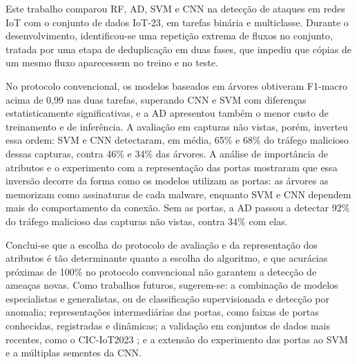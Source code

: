 \documentclass[alpha-refs,brazilian]{CC-EC_TF-TC}
\begin{document}
Este trabalho comparou RF, AD, SVM e CNN na detecção de ataques em redes IoT com o conjunto de dados IoT-23, em tarefas binária e multiclasse. Durante o desenvolvimento, identificou-se uma repetição extrema de fluxos no conjunto, tratada por uma etapa de deduplicação em duas fases, que impediu que cópias de um mesmo fluxo aparecessem no treino e no teste.

No protocolo convencional, os modelos baseados em árvores obtiveram F1-macro acima de 0,99 nas duas tarefas, superando CNN e SVM com diferenças estatisticamente significativas, e a AD apresentou também o menor custo de treinamento e de inferência. A avaliação em capturas não vistas, porém, inverteu essa ordem: SVM e CNN detectaram, em média, 65\% e 68\% do tráfego malicioso dessas capturas, contra 46\% e 34\% das árvores. A análise de importância de atributos e o experimento com a representação das portas mostraram que essa inversão decorre da forma como os modelos utilizam as portas: as árvores as memorizam como assinaturas de cada malware, enquanto SVM e CNN dependem mais do comportamento da conexão. Sem as portas, a AD passou a detectar 92\% do tráfego malicioso das capturas não vistas, contra 34\% com elas.

Conclui-se que a escolha do protocolo de avaliação e da representação dos atributos é tão determinante quanto a escolha do algoritmo, e que acurácias próximas de 100\% no protocolo convencional não garantem a detecção de ameaças novas. Como trabalhos futuros, sugerem-se: a combinação de modelos especialistas e generalistas, ou de classificação supervisionada e detecção por anomalia; representações intermediárias das portas, como faixas de portas conhecidas, registradas e dinâmicas; a validação em conjuntos de dados mais recentes, como o CIC-IoT2023 \citep{neto2023ciciot2023}; e a extensão do experimento das portas ao SVM e a múltiplas sementes da CNN.


\end{document}
